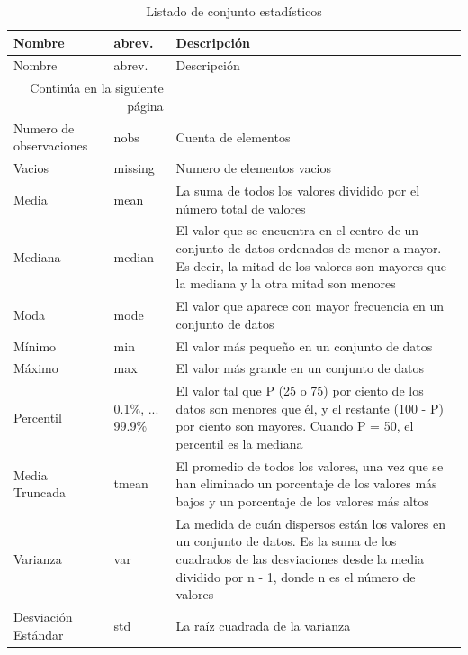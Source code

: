 \begin{longtable}{|m{7em}|m{5em}|m{20em}|}
    \caption{Listado de conjunto estadísticos} 
    \label{tab-stats} \\
    \hline
    \rowcolor[gray]{0.8}
    Nombre & abrev. & Descripción \\
    \hline
    \endfirsthead
    
    \hline
    \rowcolor[gray]{0.8}
    Nombre & abrev. & Descripción \\
    \hline
    \endhead
    
    \hline \multicolumn{2}{|r|}{{Continúa en la siguiente página}} \\ \hline
    \endfoot
    
    \hline \hline
    \endlastfoot
    \hline
    Numero de observaciones & nobs & Cuenta de elementos \\
    \hline
    Vacios & missing & Numero de elementos vacios \\
    \hline
    Media & mean & La suma de todos los valores dividido por el número total de valores \\
    \hline
    Mediana & median & El valor que se encuentra en el centro de un conjunto de datos ordenados de menor a mayor. Es decir, la mitad de los valores son mayores que la mediana y la otra mitad son menores \\
    \hline
    Moda & mode & El valor que aparece con mayor frecuencia en un conjunto de datos \\
    \hline
    Mínimo & min & El valor más pequeño en un conjunto de datos \\
    \hline
    Máximo & max & El valor más grande en un conjunto de datos \\
    \hline
    Percentil & 0.1\%, ... 99.9\% & El valor tal que P (25 o 75) por ciento de los datos son menores que él, y el restante (100 - P) por ciento son mayores. Cuando P = 50, el percentil es la mediana \\
    \hline
    Media Truncada & tmean & El promedio de todos los valores, una vez que se han eliminado un porcentaje de los valores más bajos y un porcentaje de los valores más altos \\
    \hline
    Varianza & var & La medida de cuán dispersos están los valores en un conjunto de datos. Es la suma de los cuadrados de las desviaciones desde la media dividido por n - 1, donde n es el número de valores \\
    \hline
    Desviación Estándar & std & La raíz cuadrada de la varianza \\

\end{longtable}

